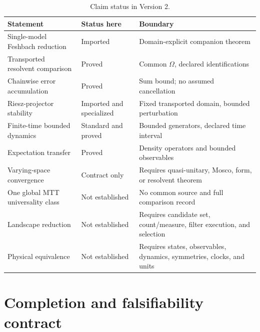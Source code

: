 \documentclass[11pt]{article}
\theoremstyle{definition}
\theoremstyle{remark}
\newcommand{\1}{\mathbf 1}
\begin{document}
\begin{table}[htbp]
\centering
\small
\begin{tabularx}{\textwidth}{L{0.31\textwidth}L{0.18\textwidth}Y}
\toprule
Statement & Status here & Boundary \\
\midrule
Single-model Feshbach reduction
& Imported
& Domain-explicit companion theorem \\
Transported resolvent comparison
& Proved
& Common \(\Omega\), declared identifications \\
Chainwise error accumulation
& Proved
& Sum bound; no assumed cancellation \\
Riesz-projector stability
& Imported and specialized
& Fixed transported domain, bounded perturbation \\
Finite-time bounded dynamics
& Standard and proved
& Bounded generators, declared time interval \\
Expectation transfer
& Proved
& Density operators and bounded observables \\
Varying-space convergence
& Contract only
& Requires quasi-unitary, Mosco, form, or resolvent theorem \\
One global MTT universality class
& Not established
& No common source and full comparison record \\
Landscape reduction
& Not established
& Requires candidate set, count/measure, filter execution, and selection \\
Physical equivalence
& Not established
& Requires states, observables, dynamics, symmetries, clocks, and units \\
\bottomrule
\end{tabularx}
\caption{Claim status in Version 2.}
\label{tab:status}
\end{table}

\section{Completion and falsifiability contract}
\label{sec:completion}
\end{document}
